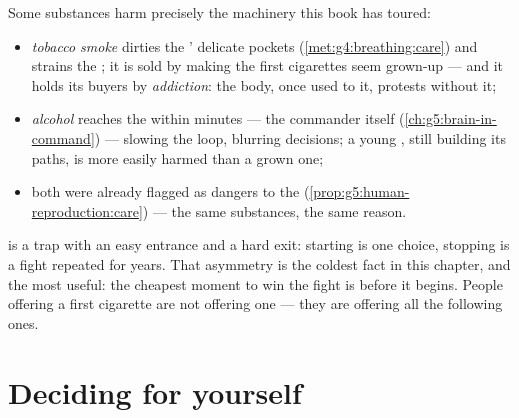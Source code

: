 \begin{proposition}\label{prop:g5:healthy-choices:substances}
Some substances harm precisely the machinery this book has
toured:
\begin{itemize}
  \item \emph{tobacco smoke} dirties the ' delicate
        pockets (\cref{met:g4:breathing:care}) and strains
        the ; it is sold by making the first cigarettes
        seem grown-up --- and it holds its buyers by
        \emph{addiction}: the body, once
        used to it, protests without it;
  \item \emph{alcohol} reaches the  within minutes
        --- the commander itself
        (\cref{ch:g5:brain-in-command}) --- slowing the loop,
        blurring decisions; a young , still building
        its paths, is more easily harmed than a grown one;
  \item both were already flagged as dangers to the 
        (\cref{prop:g5:human-reproduction:care}) --- the
        same substances, the same reason.
\end{itemize}
\end{proposition}
\admitted

\begin{remark}\label{rem:g5:healthy-choices:never}
 is a trap with an easy entrance and a hard exit:
starting is one choice, stopping is a fight repeated for
years. That asymmetry is the coldest fact in this chapter,
and the most useful: the cheapest moment to win the fight
is before it begins. People offering a first cigarette are
not offering one --- they are offering all the following
ones.
\end{remark}

\section{Deciding for yourself}

